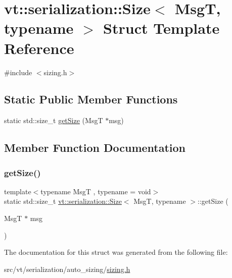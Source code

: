 \hypertarget{structvt_1_1serialization_1_1_size}{}\section{vt\+:\+:serialization\+:\+:Size$<$ MsgT, typename $>$ Struct Template Reference}
\label{structvt_1_1serialization_1_1_size}


{\ttfamily \#include $<$sizing.\+h$>$}

\subsection*{Static Public Member Functions}
\begin{DoxyCompactItemize}
\item 
static std\+::size\+\_\+t \hyperlink{structvt_1_1serialization_1_1_size_a280711fb21f8b2abd7b35615102116af}{get\+Size} (MsgT $\ast$msg)
\end{DoxyCompactItemize}


\subsection{Member Function Documentation}
\mbox{\label{structvt_1_1serialization_1_1_size_a280711fb21f8b2abd7b35615102116af}} 
\subsubsection{\texorpdfstring{get\+Size()}{getSize()}}
{\footnotesize\ttfamily template$<$typename MsgT , typename  = void$>$ \\
static std\+::size\+\_\+t \hyperlink{structvt_1_1serialization_1_1_size}{vt\+::serialization\+::\+Size}$<$ MsgT, typename $>$\+::get\+Size (\begin{DoxyParamCaption}\item[{MsgT $\ast$}]{msg }\end{DoxyParamCaption})\hspace{0.3cm}{\ttfamily [static]}}



The documentation for this struct was generated from the following file\+:\begin{DoxyCompactItemize}
\item 
src/vt/serialization/auto\+\_\+sizing/\hyperlink{sizing_8h}{sizing.\+h}\end{DoxyCompactItemize}
